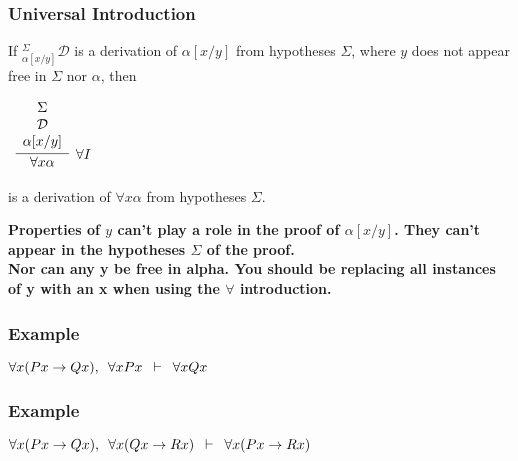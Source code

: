 \documentclass{beamer}
\theoremstyle{indentDefn} \newtheorem{defn}[]{Definition}
\begin{document}
\begin{frame}
	\frametitle{Universal Introduction}
	
	If $^{\Sigma}_{\alpha[x/y]}\mathcal{D}$ is a derivation of $\alpha[x/y]$ from hypotheses $\Sigma$, where $y$ does not appear free in $\Sigma$ nor $\alpha$, then
	
	\vspace{0.5cm}
	
	\begin{center}
		$\begin{array}{c}
		\infer[\forall I]{\forall x \alpha}{\begin{array}{c} 
			\Sigma \\
			\mathcal{D} \\ 
			\alpha[x/y]
			\end{array}}
		\end{array}$
	\end{center}
	
	is a derivation of $\forall x \alpha$ from hypotheses $\Sigma$. 
	
	\vspace{5mm} 
	
	{\bf Properties of $y$ can't play a role in the proof of $\alpha[x/y]$. They can't appear in the hypotheses $\Sigma$ of the proof.} \\
	
	{\bf Nor can any y be free in alpha. You should be replacing all instances of y with an x when using the $\forall$ introduction.}
	
\end{frame}

\begin{frame}
	\frametitle{Example}
	
	$\forall x (Px \rightarrow Qx), \hspace{0.5em} \forall x Px \hspace{0.5em} \vdash \hspace{0.5em} \forall x Qx$
	
	\vspace{7cm}
	
\end{frame}

\begin{frame}
	\frametitle{Example}
	
	$\forall x (Px \rightarrow Qx), \hspace{0.5em} \forall x (Qx \rightarrow Rx) \hspace{0.5em} \vdash \hspace{0.5em} \forall x (Px \rightarrow Rx)$
	
	
	\vspace{7cm}
	
\end{frame}
\end{document}
